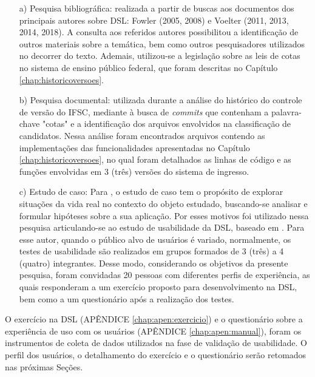 \begin{enumerate}
    \item[a)] Pesquisa bibliográfica: realizada a partir de buscas aos documentos dos principais autores sobre \gls{DSL}: Fowler (2005, 2008) e Voelter (2011, 2013, 2014, 2018). A consulta aos referidos autores possibilitou a identificação de outros materiais sobre a temática, bem como outros pesquisadores utilizados no decorrer do texto. Ademais, utilizou-se a legislação sobre as leis de cotas no sistema de ensino público federal, que foram descritas no Capítulo \ref{chap:historicoversoes}. 

    
    \item[b)] Pesquisa documental: utilizada durante a análise do histórico do controle de versão do \gls{IFSC}, mediante à busca de \textit{commits} que contenham a palavra-chave "cotas" e a identificação dos arquivos envolvidos na classificação de candidatos. Nessa análise foram encontrados arquivos contendo as implementações das funcionalidades apresentadas no Capítulo \ref{chap:historicoversoes}, no qual foram detalhados as linhas de código e as funções envolvidas em 3 (três) versões do sistema de ingresso. 
    
    \item[c)] Estudo de caso: Para , o estudo de caso tem o propósito de explorar situações da vida real no contexto do objeto estudado, buscando-se analisar e formular hipóteses sobre a sua aplicação. Por esses motivos foi utilizado nessa pesquisa articulando-se ao estudo de usabilidade da \gls{DSL}, baseado em . Para esse autor, quando o público alvo de usuários é variado, normalmente, os testes de usabilidade são realizados em grupos formados de 3 (três) a 4 (quatro) integrantes. Desse modo, considerando os objetivos da presente pesquisa, foram convidadas 20 pessoas com diferentes perfis de experiência, as quais responderam a um exercício proposto para desenvolvimento na \gls{DSL}, bem como a um questionário após a realização dos testes. 
    
\end{enumerate}

    O exercício na DSL (APÊNDICE \ref{chap:apen:exercicio}) e o questionário sobre a experiência de uso com os usuários (APÊNDICE \ref{chap:apen:manual}), foram os instrumentos de coleta de dados utilizados na fase de validação de usabilidade. O perfil dos usuários, o detalhamento do exercício e o questionário serão retomados nas próximas Seções.
    
